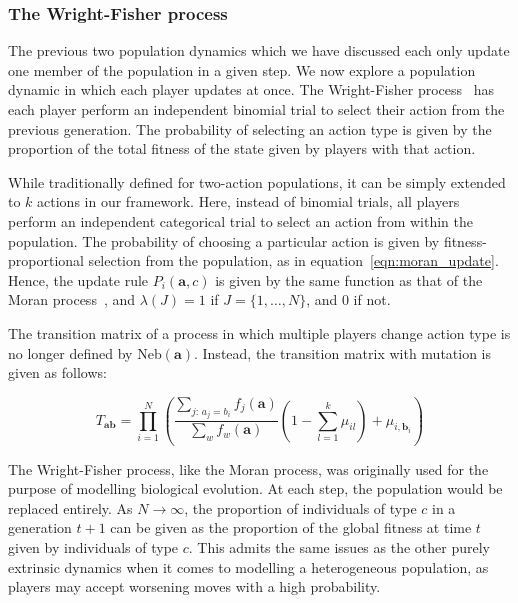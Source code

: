 \documentclass{article}
\begin{document}
\subsubsection{The Wright-Fisher process}

The previous two population dynamics which we have discussed each only update
one member of the population in a given step. We now explore a population
dynamic in which each player updates at once. The Wright-Fisher
process~\cite{Fisher_1923, wright1931evolution} has each player perform an
independent binomial trial to select their action from the previous generation.
The probability of selecting an action type is given by the proportion of the
total fitness of the state given by players with that action. 

While traditionally defined for two-action populations, it can be simply
extended to \(k\) actions in our framework. Here, instead of binomial trials,
all players perform an independent categorical trial to select an action from
within the population. The probability of choosing a particular action is given
by fitness-proportional selection from the population, as in
equation~\ref{eqn:moran_update}. Hence, the update rule \(P_i(\mathbf{a}, c)\)
is given by the same function as that of the Moran
process~\cite{imhof_evolutionary_2006}, and \(\lambda(J) = 1\) if \(J = \{1,
\dots, N\}\), and \(0\) if not.

The transition matrix of a process in which multiple players change action type
is no longer defined by Neb\((\textbf{a})\). Instead, the transition matrix with
mutation is given as follows:

\begin{equation}
    T_{\mathbf{ab}} = \prod_{i=1}^N \left(\dfrac{\sum_{j:\, a_j = b_{i}} f_j(\mathbf{a})}{\sum_w f_w(\mathbf{a})}\left(1 - \sum_{l=1}^k \mu_{il}\right)+ \mu_{i, \mathbf{b}_{i}}\right)
\label{eqn:wf_tm}
\end{equation}

The Wright-Fisher process, like the Moran process, was originally used for the
purpose of modelling biological evolution. At each step, the population would be
replaced entirely. As \(N \to \infty\), the proportion of individuals of type
\(c\) in a generation \(t+1\) can be given as the proportion of the global
fitness at time \(t\) given by individuals of type \(c\). This admits the same
issues as the other purely extrinsic dynamics when it comes to modelling a
heterogeneous population, as players may accept worsening moves with a high
probability.
\end{document}
